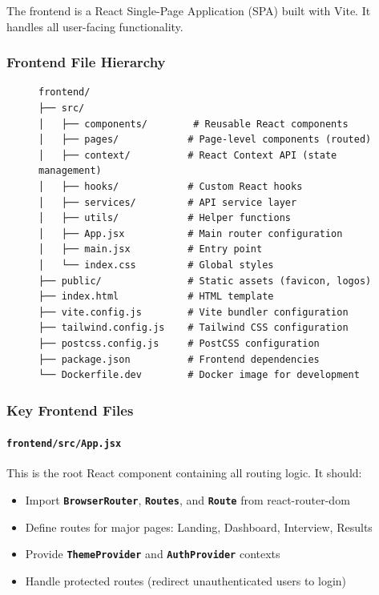 \documentclass[12pt,a4paper,oneside]{article}
\newcommand{\fileref}[1]{\texttt{#1}}
\newcommand{\classname}[1]{\texttt{\textbf{#1}}}
\begin{document}
The frontend is a React Single-Page Application (SPA) built with Vite. It handles all user-facing functionality.

\subsubsection{Frontend File Hierarchy}

\begin{figure}[H]
\centering
\begin{verbatim}
frontend/
├── src/
│   ├── components/        # Reusable React components
│   ├── pages/            # Page-level components (routed)
│   ├── context/          # React Context API (state management)
│   ├── hooks/            # Custom React hooks
│   ├── services/         # API service layer
│   ├── utils/            # Helper functions
│   ├── App.jsx           # Main router configuration
│   ├── main.jsx          # Entry point
│   └── index.css         # Global styles
├── public/               # Static assets (favicon, logos)
├── index.html            # HTML template
├── vite.config.js        # Vite bundler configuration
├── tailwind.config.js    # Tailwind CSS configuration
├── postcss.config.js     # PostCSS configuration
├── package.json          # Frontend dependencies
└── Dockerfile.dev        # Docker image for development
\end{verbatim}
\end{figure}

\subsubsection{Key Frontend Files}

\paragraph{\fileref{frontend/src/App.jsx}}

This is the root React component containing all routing logic. It should:
\begin{itemize}
    \item Import \classname{BrowserRouter}, \classname{Routes}, and \classname{Route} from react-router-dom
    \item Define routes for major pages: Landing, Dashboard, Interview, Results
    \item Provide \classname{ThemeProvider} and \classname{AuthProvider} contexts
    \item Handle protected routes (redirect unauthenticated users to login)
\end{itemize}
\end{document}
